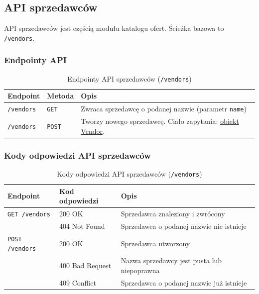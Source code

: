 \documentclass[11pt]{article}
\begin{document}
\subsection{API sprzedawców}

API sprzedawców jest częścią modułu katalogu ofert. Ścieżka bazowa to \texttt{/vendors}.



\subsubsection{Endpointy API}

\begin{table}[H]
  \centering
  \renewcommand{\arraystretch}{1.3}
  \begin{tabularx}{\textwidth}{|l|l|X|}
    \hline
    \textbf{Endpoint} & \textbf{Metoda} & \textbf{Opis} \\
    \hline
    \texttt{/vendors} & \texttt{GET} & Zwraca sprzedawcę o podanej nazwie (parametr \texttt{name}) \\
    \hline
    \texttt{/vendors} & \texttt{POST} & Tworzy nowego sprzedawcę. Ciało zapytania: \hyperref[schema:vendor]{obiekt Vendor}. \\
    \hline
  \end{tabularx}
  \caption{Endpointy API sprzedawców (\texttt{/vendors})}
  \label{tab:vendor-endpoints}
\end{table}

\subsubsection{Kody odpowiedzi API sprzedawców}

\begin{table}[H]
  \centering
  \renewcommand{\arraystretch}{1.3}
  \begin{tabularx}{\textwidth}{|l|l|X|}
    \hline
    \textbf{Endpoint} & \textbf{Kod odpowiedzi} & \textbf{Opis} \\
    \hline
    \texttt{GET /vendors} & 200 OK & Sprzedawca znaleziony i zwrócony \\
    & 404 Not Found & Sprzedawca o podanej nazwie nie istnieje \\
    \hline
    \texttt{POST /vendors} & 200 OK & Sprzedawca utworzony \\
    & 400 Bad Request & Nazwa sprzedawcy jest pusta lub niepoprawna \\
    & 409 Conflict & Sprzedawca o podanej nazwie już istnieje \\
    \hline
  \end{tabularx}
  \caption{Kody odpowiedzi API sprzedawców (\texttt{/vendors})}
  \label{tab:vendor-response-codes}
\end{table}
\end{document}
